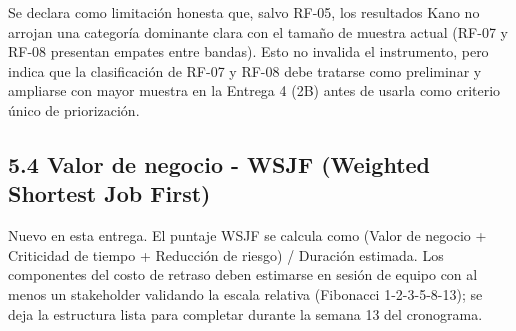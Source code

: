Se declara como limitación honesta que, salvo RF-05, los resultados Kano no arrojan una categoría dominante clara con el tamaño de muestra actual (RF-07 y RF-08 presentan empates entre bandas). Esto no invalida el instrumento, pero indica que la clasificación de RF-07 y RF-08 debe tratarse como preliminar y ampliarse con mayor muestra en la Entrega 4 (2B) antes de usarla como criterio único de priorización.

\subsection*{5.4 Valor de negocio - WSJF (Weighted Shortest Job First)}


Nuevo en esta entrega. El puntaje WSJF se calcula como (Valor de negocio + Criticidad de tiempo + Reducción de riesgo) / Duración estimada. Los componentes del costo de retraso deben estimarse en sesión de equipo con al menos un stakeholder validando la escala relativa (Fibonacci 1-2-3-5-8-13); se deja la estructura lista para completar durante la semana 13 del cronograma.


